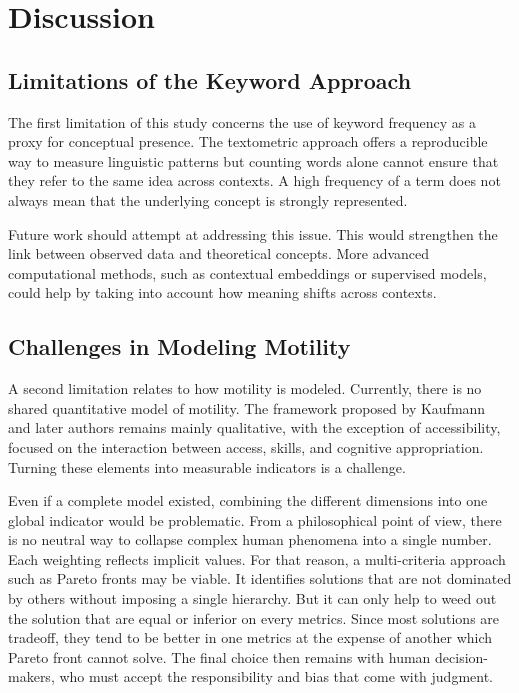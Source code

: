 \section{Discussion}

\subsection{Limitations of the Keyword Approach}

The first limitation of this study concerns the use of keyword frequency as a proxy for conceptual presence. The textometric approach offers a reproducible way to measure linguistic patterns but counting words alone cannot ensure that they refer to the same idea across contexts. A high frequency of a term does not always mean that the underlying concept is strongly represented.

Future work should attempt at addressing this issue. This would strengthen the link between observed data and theoretical concepts. More advanced computational methods, such as contextual embeddings or supervised models, could help by taking into account how meaning shifts across contexts.

\subsection{Challenges in Modeling Motility}

A second limitation relates to how motility is modeled. Currently, there is no shared quantitative model of motility. The framework proposed by Kaufmann and later authors remains mainly qualitative, with the exception of accessibility, focused on the interaction between access, skills, and cognitive appropriation. Turning these elements into measurable indicators is a challenge.

Even if a complete model existed, combining the different dimensions into one global indicator would be problematic. From a philosophical point of view, there is no neutral way to collapse complex human phenomena into a single number. Each weighting reflects implicit values. For that reason, a multi-criteria approach such as Pareto fronts may be viable. It identifies solutions that are not dominated by others without imposing a single hierarchy. But it can only help to weed out the solution that are equal or inferior on every metrics. Since most solutions are tradeoff, they tend to be better in one metrics at the expense of another which Pareto front cannot solve. The final choice then remains with human decision-makers, who must accept the responsibility and bias that come with judgment.

